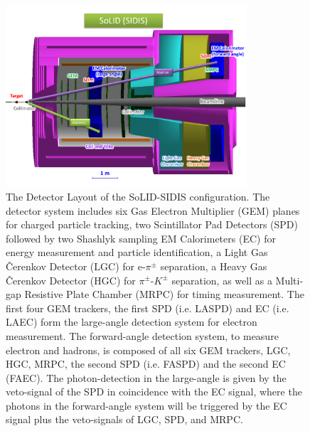 \begin{figure}[!ht]
 \begin{center}
  \includegraphics[width=0.8\textwidth]{./figures/SoLID_SIDIS_setup.pdf}
   \caption[The Detector Layout of the SoLID-SIDIS configuration]{\footnotesize{The Detector Layout of the SoLID-SIDIS configuration. The detector system includes six Gas Electron Multiplier (GEM) planes for charged particle tracking, two Scintillator Pad Detectors (SPD) followed by two Shashlyk sampling EM Calorimeters (EC) for energy measurement and particle identification, a Light Gas \v{C}erenkov Detector (LGC) for e-$\pi^{\pm}$ separation, a Heavy Gas \v{C}erenkov Detector (HGC) for $\pi^{\pm}$-$K^{\pm}$ separation, as well as a Multi-gap Resistive Plate Chamber (MRPC) for timing measurement. The first four GEM trackers, the first SPD (i.e. LASPD) and EC (i.e. LAEC) form the large-angle detection system for electron measurement. The forward-angle detection system, to measure electron and hadrons, is composed of all six GEM trackers, LGC, HGC, MRPC, the second SPD (i.e. FASPD) and the second EC (FAEC). The photon-detection in the large-angle is given by the veto-signal of the SPD in coincidence with the EC signal, where the photons in the forward-angle system will be triggered by the EC signal plus the veto-signals of LGC, SPD, and MRPC.}}
   \label{solid_sidis}
 \end{center}
\end{figure}

